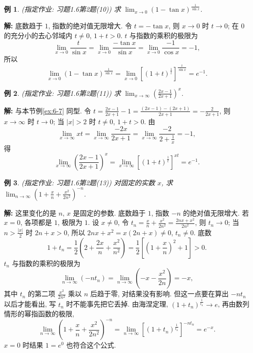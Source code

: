 \documentclass[UTF8,openany]{ctexbook}
\theoremstyle{chinesetextbook}
\newtheorem{example}{例}[section]
\newenvironment{cnsolution}{\par\indent\textbf{解:} \ignorespaces}{\par}
\begin{document}
\begin{example}
\textnormal{(指定作业: 习题1.6第2题(10))} 求 $\displaystyle\lim_{x\to0}(1-\tan x)^{\frac1{\sin x}}$.
\end{example}
\begin{cnsolution}
底数趋于 $1$, 指数的绝对值无限增大. 令 $t=-\tan x$, 则 $x\to0$ 时 $t\to0$; 在 $0$ 的充分小的去心邻域内 $t\ne0$, $1+t>0$. $t$ 与指数的乘积的极限为
\[
\lim_{x\to0}\frac t{\sin x}=\lim_{x\to0}\frac{-\tan x}{\sin x}=\lim_{x\to0}\frac{-1}{\cos x}=-1,
\]
所以
\[
\lim_{x\to0}(1-\tan x)^{\frac1{\sin x}}=\lim_{x\to0}\left[(1+t)^{\frac1t}\right]^{\frac t{\sin x}}=e^{-1}.
\]
\end{cnsolution}
\begin{example}
\textnormal{(指定作业: 习题1.6第2题(11))} 求 $\displaystyle\lim_{x\to\infty}\left(\frac{2x-1}{2x+1}\right)^x$.
\end{example}
\begin{cnsolution}
与本节例\ref{ex:6-7} 同型. 令 $\displaystyle t=\frac{2x-1}{2x+1}-1=\frac{(2x-1)-(2x+1)}{2x+1}=-\frac2{2x+1}$, 则 $x\to\infty$ 时 $t\to0$; 当 $|x|>2$ 时 $t\ne0$, $1+t>0$. 由
\[
\lim_{x\to\infty}xt=\lim_{x\to\infty}\frac{-2x}{2x+1}=\lim_{x\to\infty}\frac{-2}{2+\frac1x}=-1,
\]
得
\[
\lim_{x\to\infty}\left(\frac{2x-1}{2x+1}\right)^x=\lim_{x\to\infty}\left[(1+t)^{\frac1t}\right]^{xt}=e^{-1}.
\]
\end{cnsolution}
\begin{example}
\textnormal{(指定作业: 习题1.6第2题(13))} 对固定的实数 $x$, 求 $\displaystyle\lim_{n\to\infty}\left(1+\frac xn+\frac{x^2}{2n^2}\right)^{-n}$.
\end{example}
\begin{cnsolution}
这里变化的是 $n$, $x$ 是固定的参数. 底数趋于 $1$, 指数 $-n$ 的绝对值无限增大. 若 $x=0$, 各项都是 $1$, 极限为 $1$. 设 $x\ne0$, 令 $\displaystyle t_n=\frac xn+\frac{x^2}{2n^2}=\frac{2nx+x^2}{2n^2}$, 则 $t_n\to0$; 当 $\displaystyle n>\frac{|x|}2$ 时 $2n+x>0$, 所以 $2nx+x^2=x(2n+x)\ne0$, $t_n\ne0$. 底数
\[
1+t_n=\frac12\left(2+\frac{2x}n+\frac{x^2}{n^2}\right)=\frac12\left[\left(1+\frac xn\right)^2+1\right]>0.
\]
$t_n$ 与指数的乘积的极限为
\[
\lim_{n\to\infty}(-nt_n)=\lim_{n\to\infty}\left(-x-\frac{x^2}{2n}\right)=-x,
\]
其中 $t_n$ 的第二项 $\displaystyle\frac{x^2}{2n^2}$ 乘以 $n$ 后趋于零, 对结果没有影响. 但这一点要在算出 $-nt_n$ 以后才能看出, 写 $t_n$ 时不能事先把它丢掉. 由海涅定理, $\displaystyle(1+t_n)^{\frac1{t_n}}\to e$, 再由数列情形的幂指函数的极限,
\[
\lim_{n\to\infty}\left(1+\frac xn+\frac{x^2}{2n^2}\right)^{-n}=\lim_{n\to\infty}\left[(1+t_n)^{\frac1{t_n}}\right]^{-nt_n}=e^{-x}.
\]
$x=0$ 时结果 $1=e^0$ 也符合这个公式.
\end{cnsolution}
\end{document}
